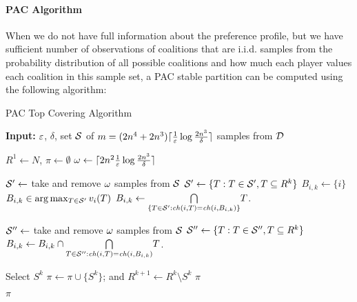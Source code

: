 \paragraph{PAC Algorithm}
\label{para:pac_algo}

When we do not have full information about the preference profile, but we have
sufficient number of observations of coalitions that are i.i.d. samples from
the probability distribution of all possible coalitions and how much each player
values each coalition in this sample set, a PAC stable partition can be computed
using the following algorithm:

\begin{algorithm}[htb]
  \caption{PAC Top Covering Algorithm}
  \label{alg:pac_top_covering}
  \textbf{Input:} $\eps$, $\delta$, set $\cal S$ of $m = (2n^4 + 2n^3)\ceil{\frac{1}{\eps}\log\frac{2n^3}{\delta}}$ samples from $\cal D$
  \begin{algorithmic}[1]

  \State $R^1 \gets N$, $\pi \gets \emptyset$
  \State $\samples \gets \ceil{2n^2 \frac{1}{\eps}\log\frac{2n^3}{\delta}}$

    \State \label{pac_top_cover:sample_begin} $\cal S' \gets$ take and remove $\samples$ samples from $\cal S$
    \State $\cal S' \gets \{T: T \in \cal S', T \subseteq R^k\}$
        \State$B_{i,k} \gets \{i\}$
      \Else
        \State \label{pac_top_cover:argmax} $B_{i,k} \in \arg\max_{T \in \cal S'}{v_i(T)}$
        \State $B_{i,k} \gets \underset{\{T \in \cal S' : \ch(i,T) = \ch(i,B_{i,k})\}}{\bigcap} T$.
      \EndIf
    \EndFor

      \State $\cal S'' \gets$ take and remove $\samples$ samples from $\cal S$
      \State $\cal S'' \gets \{T: T \in \cal S'', T \subseteq R^k\}$
        \State $B_{i,k} \gets B_{i,k} \cap \underset{T \in \cal S'' : \ch(i,T) = \ch(i,B_{i,k})}{\bigcap} T$.
      \EndFor
    \EndFor \label{pac_top_cover:sample_end}

    \State \label{pac_top_cover:select} Select $S^k$
    \State $\pi \leftarrow  \pi \cup \lbrace S^k \rbrace$; and $R^{k+1} \leftarrow  R^k \setminus S^k$
      \State \Return $\pi$
    \EndIf
  \EndFor

  \State \Return $\pi$
 \end{algorithmic}
\end{algorithm}

